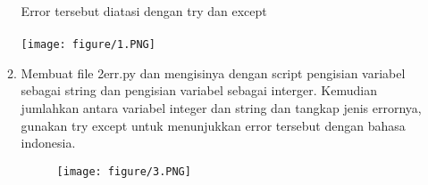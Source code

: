 \documentclass{article}
\begin{document}
\begin{enumerate}
\begin{enumerate}
\par Error tersebut diatasi dengan try dan except
\paragraph{}
\centerline{\texttt{[image: figure/1.PNG]}}


\item
Membuat file 2err.py dan mengisinya dengan script pengisian variabel sebagai string dan pengisian variabel sebagai interger. 
Kemudian jumlahkan antara variabel integer dan string dan tangkap jenis errornya, gunakan try except untuk menunjukkan error tersebut dengan
bahasa indonesia.
\begin{figure}[h]
\centerline{\texttt{[image: figure/3.PNG]}}
\end{figure}

\end{enumerate}





\end{enumerate}
\end{document}
